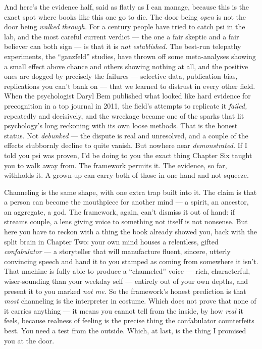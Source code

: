 \documentclass[11pt,openany]{book}
\begin{document}
And here’s the evidence half, said as flatly as I can manage, because this is the exact spot where books like this one go to die. The door being \textit{open} is not the door being \textit{walked through.} For a century people have tried to catch psi in the lab, and the most careful current verdict — the one a fair skeptic and a fair believer can both sign — is that it is \textit{not established.} The best-run telepathy experiments, the “ganzfeld” studies, have thrown off some meta-analyses showing a small effect above chance and others showing nothing at all, and the positive ones are dogged by precisely the failures — selective data, publication bias, replications you can’t bank on — that we learned to distrust in every other field. When the psychologist Daryl Bem published what looked like hard evidence for precognition in a top journal in 2011, the field’s attempts to replicate it \textit{failed,} repeatedly and decisively, and the wreckage became one of the sparks that lit psychology’s long reckoning with its own loose methods. That is the honest status. Not \textit{debunked} — the dispute is real and unresolved, and a couple of the effects stubbornly decline to quite vanish. But nowhere near \textit{demonstrated.} If I told you psi was proven, I’d be doing to you the exact thing Chapter Six taught you to walk away from. The framework permits it. The evidence, so far, withholds it. A grown-up can carry both of those in one hand and not squeeze.

Channeling is the same shape, with one extra trap built into it. The claim is that a person can become the mouthpiece for another mind — a spirit, an ancestor, an aggregate, a god. The framework, again, can’t dismiss it out of hand: if streams couple, a lens giving voice to something not itself is not nonsense. But here you have to reckon with a thing the book already showed you, back with the split brain in Chapter Two: your own mind houses a relentless, gifted \textit{confabulator} — a storyteller that will manufacture fluent, sincere, utterly convincing speech and hand it to you stamped as coming from somewhere it isn’t. That machine is fully able to produce a “channeled” voice — rich, characterful, wiser-sounding than your weekday self — entirely out of your own depths, and present it to you marked \textit{not me.} So the framework’s honest prediction is that \textit{most} channeling is the interpreter in costume. Which does not prove that none of it carries anything — it means you cannot tell from the inside, by how \textit{real} it feels, because realness of feeling is the precise thing the confabulator counterfeits best. You need a test from the outside. Which, at last, is the thing I promised you at the door.
\end{document}
